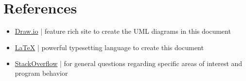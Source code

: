 \documentclass[12pt]{article}
\begin{document}
\section{References}

\begin{itemize}
\item \href{https://app.diagrams.net/}{Draw.io} | feature rich site to create the UML diagrams in this document
\item \href{https://www.latex-project.org/}{\LaTeX} | powerful typesetting language to create this document
\item \href{https://stackoverflow.com/}{StackOverflow} | for general questions regarding specific areas of interest and program behavior
\end{itemize}
\end{document}
